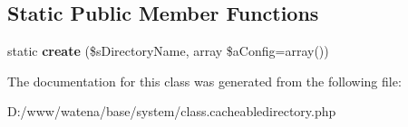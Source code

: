 \subsection*{Static Public Member Functions}
\begin{DoxyCompactItemize}
\item 
\hypertarget{class_cacheable_directory_abcb3bc93c53aeff6dd07d50f2c85acb3}{static {\bfseries create} (\$s\-Directory\-Name, array \$a\-Config=array())}\label{class_cacheable_directory_abcb3bc93c53aeff6dd07d50f2c85acb3}

\end{DoxyCompactItemize}


The documentation for this class was generated from the following file\-:\begin{DoxyCompactItemize}
\item 
D\-:/www/watena/base/system/class.\-cacheabledirectory.\-php\end{DoxyCompactItemize}
